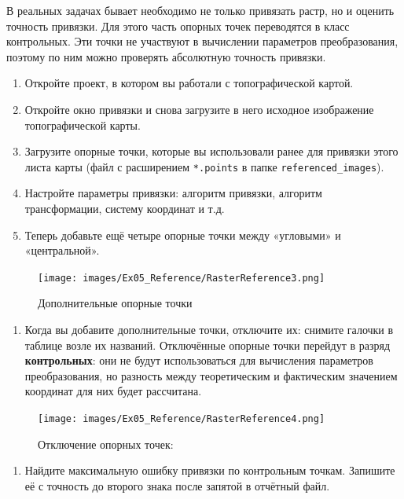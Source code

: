 \documentclass[
  12pt,
]{book}
\providecommand{\tightlist}{%
  \setlength{\itemsep}{0pt}\setlength{\parskip}{0pt}}
\begin{document}
В реальных задачах бывает необходимо не только привязать растр, но и оценить точность привязки. Для этого часть опорных точек переводятся в класс контрольных. Эти точки не участвуют в вычислении параметров преобразования, поэтому по ним можно проверять абсолютную точность привязки.

\begin{enumerate}
\def\labelenumi{\arabic{enumi}.}
\item
  Откройте проект, в котором вы работали с топографической картой.
\item
  Откройте окно привязки и снова загрузите в него исходное изображение топографической карты.
\item
  Загрузите опорные точки, которые вы использовали ранее для привязки этого листа карты (файл с расширением \texttt{*.points} в папке \texttt{referenced\_images}).
\item
  Настройте параметры привязки: алгоритм привязки, алгоритм трансформации, систему координат и т.д.
\item
  Теперь добавьте ещё четыре опорные точки между «угловыми» и «центральной».
\end{enumerate}

\begin{figure}
\centering
\texttt{[image: images/Ex05\_Reference/RasterReference3.png]}
\caption{Дополнительные опорные точки}
\end{figure}

\begin{enumerate}
\def\labelenumi{\arabic{enumi}.}
\setcounter{enumi}{4}
\tightlist
\item
  Когда вы добавите дополнительные точки, отключите их: снимите галочки в таблице возле их названий. Отключённые опорные точки перейдут в разряд \textbf{контрольных}: они не будут использоваться для вычисления параметров преобразования, но разность между теоретическим и фактическим значением координат для них будет рассчитана.
\end{enumerate}

\begin{figure}
\centering
\texttt{[image: images/Ex05\_Reference/RasterReference4.png]}
\caption{Отключение опорных точек:}
\end{figure}

\begin{enumerate}
\def\labelenumi{\arabic{enumi}.}
\setcounter{enumi}{5}
\tightlist
\item
  Найдите максимальную ошибку привязки по контрольным точкам. Запишите её с точность до второго знака после запятой в отчётный файл.
\end{enumerate}
\end{document}
